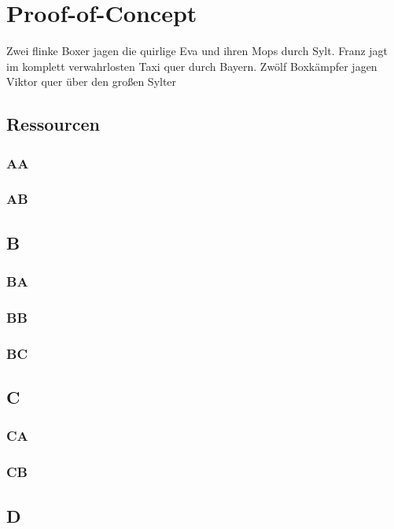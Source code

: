 \section{Proof-of-Concept}
Zwei flinke Boxer jagen die quirlige Eva und ihren Mops durch Sylt. Franz jagt im komplett verwahrlosten Taxi quer durch Bayern. Zwölf Boxkämpfer jagen Viktor quer über den großen Sylter

\subsection{Ressourcen}

\subsubsection{AA}

\subsubsection{AB}

\subsection{B}

\subsubsection{BA}

\subsubsection{BB}

\subsubsection{BC}

\subsection{C}

\subsubsection{CA}

\subsubsection{CB}

\subsection{D}

\newpage
